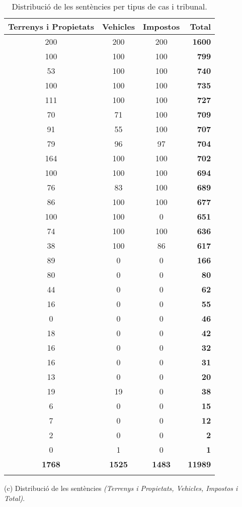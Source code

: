 \pagebreak
  
  \begin{table}[H]
    \centering
    \begin{tabular}{ccc|r|}
        \Xhline{2\arrayrulewidth}
        \textbf{Terrenys i Propietats} &
        \textbf{Vehicles} &
        \textbf{Impostos} &
        \textbf{Total} \\
        \hline
        200 & 200 & 200 & \textbf{1600} \\
        100 & 100 & 100 & \textbf{799} \\
        53 & 100 & 100 & \textbf{740} \\
        100 & 100 & 100 & \textbf{735} \\
        111 & 100 & 100 & \textbf{727} \\
        70 & 71 & 100 & \textbf{709} \\
        91 & 55 & 100 & \textbf{707} \\
        79 & 96 & 97 & \textbf{704} \\
        164 & 100 & 100 & \textbf{702} \\
        100 & 100 & 100 & \textbf{694} \\
        76 & 83 & 100 & \textbf{689} \\
        86 & 100 & 100 & \textbf{677} \\
        100 & 100 & 0 & \textbf{651} \\
        74 & 100 & 100 & \textbf{636} \\
        38 & 100 & 86 & \textbf{617} \\
        89 & 0 & 0 & \textbf{166} \\
        80 & 0 & 0 & \textbf{80} \\
        44 & 0 & 0 & \textbf{62} \\
        16 & 0 & 0 & \textbf{55} \\
        0 & 0 & 0 & \textbf{46} \\
        18 & 0 & 0 & \textbf{42} \\
        16 & 0 & 0 & \textbf{32} \\
        16 & 0 & 0 & \textbf{31} \\
        13 & 0 & 0 & \textbf{20} \\
        19 & 19 & 0 & \textbf{38} \\
        6 & 0 & 0 & \textbf{15} \\
        7 & 0 & 0 & \textbf{12} \\
        2 & 0 & 0 & \textbf{2} \\
        0 & 1 & 0 & \textbf{1} \\
        \hline
        \textbf{1768} & \textbf{1525} & \textbf{1483} & \textbf{11989} \\
        \Xhline{2\arrayrulewidth}
    \end{tabular}
    \captionsetup{font=small}
    \caption*{(c) Distribució de les sentències \textit{(Terrenys i Propietats, Vehicles, Impostos i Total)}.}
    \captionsetup{font=normalsize}
  \caption{Distribució de les sentències per tipus de cas i tribunal.}
  \label{tab:distribucio_cas_tribunal}
\end{table}
